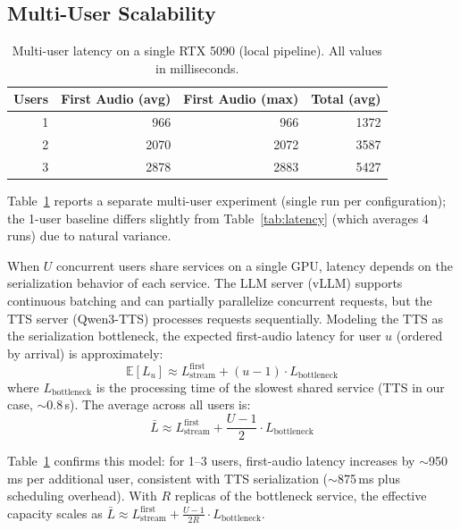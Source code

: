 \documentclass[11pt,a4paper]{article}
\begin{document}
\subsection{Multi-User Scalability}

\begin{table}[h]
    \centering
    \caption{Multi-user latency on a single RTX 5090 (local pipeline). All values in milliseconds.}
    \label{tab:multiuser}
    \begin{tabular}{rrrr}
        \toprule
        \textbf{Users} & \textbf{First Audio (avg)} & \textbf{First Audio (max)} & \textbf{Total (avg)} \\
        \midrule
        1 & 966 & 966 & 1372 \\
        2 & 2070 & 2072 & 3587 \\
        3 & 2878 & 2883 & 5427 \\
        \bottomrule
    \end{tabular}
\end{table}

Table~\ref{tab:multiuser} reports a separate multi-user experiment (single run per configuration); the 1-user baseline differs slightly from Table~\ref{tab:latency} (which averages 4 runs) due to natural variance.

When $U$ concurrent users share services on a single GPU, latency depends on the serialization behavior of each service. The LLM server (vLLM) supports continuous batching and can partially parallelize concurrent requests, but the TTS server (Qwen3-TTS) processes requests sequentially. Modeling the TTS as the serialization bottleneck, the expected first-audio latency for user $u$ (ordered by arrival) is approximately:
\begin{equation}
\label{eq:multiuser}
\mathbb{E}[L_u] \approx L_{\text{stream}}^{\text{first}} + (u - 1) \cdot L_{\text{bottleneck}}
\end{equation}
where $L_{\text{bottleneck}}$ is the processing time of the slowest shared service (TTS in our case, $\sim$0.8\,s). The average across all users is:
\begin{equation}
\label{eq:multiuser_avg}
\bar{L} \approx L_{\text{stream}}^{\text{first}} + \frac{U - 1}{2} \cdot L_{\text{bottleneck}}
\end{equation}

Table~\ref{tab:multiuser} confirms this model: for 1--3 users, first-audio latency increases by $\sim$950\,ms per additional user, consistent with TTS serialization ($\sim$875\,ms plus scheduling overhead). With $R$ replicas of the bottleneck service, the effective capacity scales as $\bar{L} \approx L_{\text{stream}}^{\text{first}} + \frac{U - 1}{2R} \cdot L_{\text{bottleneck}}$.
\end{document}
